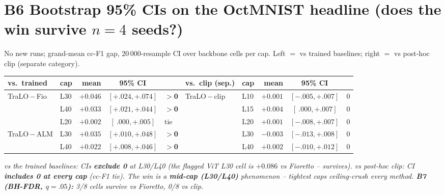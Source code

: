 \documentclass[10pt,a4paper]{article}
\newcommand{\vs}[2]{#1\,$-$\,#2}
\newcommand{\fnd}[1]{{\small\textit{#1}}\par}
\newcommand{\tbl}[1]{\begin{center}\footnotesize #1\end{center}}
\begin{document}
\section*{B6 \; Bootstrap 95\% CIs on the OctMNIST headline (does the win survive $n{=}4$ seeds?)}
{\footnotesize No new runs; grand-mean cc-F1 gap, 20\,000-resample CI over backbone cells per cap. Left $=$ vs
trained baselines; right $=$ vs post-hoc clip (separate category).}
\tbl{\begin{tabular}{llrc@{\quad}l@{\qquad\qquad}llrc@{\quad}l}
\toprule
vs.\ trained & cap & mean & 95\% CI & & vs.\ clip (sep.) & cap & mean & 95\% CI & \\
\midrule
\vs{TraLO}{Fio} & L30 & $+0.046$ & $[+.024,+.074]$ & \textbf{$>$0} & \vs{TraLO}{clip} & L10 & $+0.001$ & $[-.005,+.007]$ & 0 \\
                & L40 & $+0.033$ & $[+.021,+.044]$ & \textbf{$>$0} &                  & L15 & $+0.004$ & $[\ .000,+.007]$ & 0 \\
                & L20 & $+0.002$ & $[\ .000,+.005]$ & tie          &                  & L20 & $+0.001$ & $[-.008,+.007]$ & 0 \\
\vs{TraLO}{ALM} & L30 & $+0.035$ & $[+.010,+.048]$ & \textbf{$>$0} &                  & L30 & $-0.003$ & $[-.013,+.008]$ & 0 \\
                & L40 & $+0.022$ & $[+.008,+.046]$ & \textbf{$>$0} &                  & L40 & $+0.002$ & $[-.010,+.012]$ & 0 \\
\bottomrule
\end{tabular}}
\fnd{vs the trained baselines: CIs \textbf{exclude 0} at L30/L40 (the flagged ViT L30 cell is $+0.086$ vs
Fioretto -- survives). vs post-hoc clip: CI \textbf{includes 0 at every cap} (cc-F1 tie). The win is a
\textbf{mid-cap (L30/L40)} phenomenon -- tightest caps ceiling-crush every method. \textbf{B7 (BH-FDR,
$q{=}.05$):} 3/8 cells survive vs Fioretto, 0/8 vs clip.}

\end{document}
